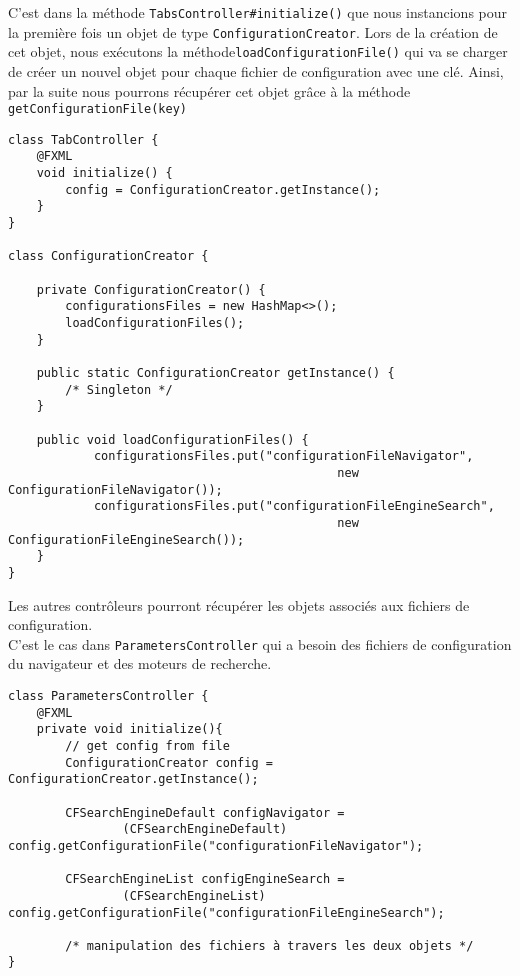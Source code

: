 \documentclass[10pt,a4paper]{article}
\begin{document}
C'est dans la méthode \verb|TabsController#initialize()| que nous instancions pour la première fois un objet de type \verb|ConfigurationCreator|. Lors de la création de cet objet, nous exécutons la méthode\verb|loadConfigurationFile()| qui va se charger de créer un nouvel objet pour chaque fichier de configuration avec une clé. Ainsi, par la suite nous pourrons récupérer cet objet grâce à la méthode \verb|getConfigurationFile(key)|

\newpage

\begin{lstlisting}
class TabController {
    @FXML
    void initialize() {
	    config = ConfigurationCreator.getInstance();
    }
}

class ConfigurationCreator {
	
	private ConfigurationCreator() {
		configurationsFiles = new HashMap<>();
		loadConfigurationFiles();
	}
	
	public static ConfigurationCreator getInstance() {
	    /* Singleton */
	}

    public void loadConfigurationFiles() {
	    	configurationsFiles.put("configurationFileNavigator", 
		                                      new ConfigurationFileNavigator());
		    configurationsFiles.put("configurationFileEngineSearch", 
		                                      new ConfigurationFileEngineSearch());
	}
}
\end{lstlisting}

Les autres contrôleurs pourront récupérer les objets associés aux fichiers de configuration. \\ C'est le cas dans \verb|ParametersController| qui a besoin des fichiers de configuration du navigateur et des moteurs de recherche.

\begin{lstlisting}
class ParametersController {
    @FXML
    private void initialize(){
        // get config from file
        ConfigurationCreator config = ConfigurationCreator.getInstance();

        CFSearchEngineDefault configNavigator = 
        		(CFSearchEngineDefault) config.getConfigurationFile("configurationFileNavigator");
        
        CFSearchEngineList configEngineSearch =
        		(CFSearchEngineList) config.getConfigurationFile("configurationFileEngineSearch");
        		
        /* manipulation des fichiers à travers les deux objets */
}
\end{lstlisting}  
\end{document}
